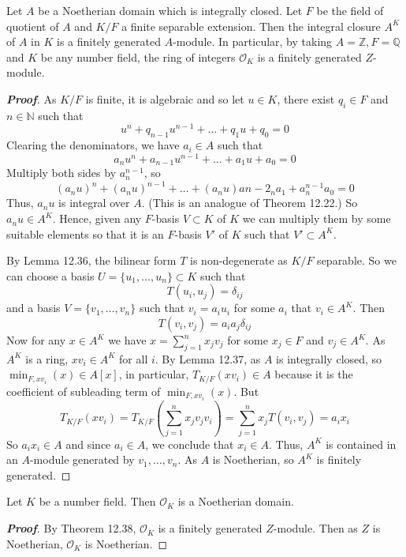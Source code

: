 \begin{theorem} Let $A$ be a Noetherian domain which is integrally closed. Let $F$ be the field of quotient of $A$ and $K/F$ a finite separable extension. Then the integral closure $A^K$ of $A$ in $K$ is a finitely generated $A$-module. In particular, by taking $A=\mathbb{Z},F=\mathbb{Q}$ and $K$ be any number field, the ring of integers $\mathcal{O}_K$ is a finitely generated $Z$-module.
\end{theorem}
\begin{proof}[\bf Proof] As $K/F$ is finite, it is algebraic and so let $u \in K$, there exist $q_i \in F$ and $n \in \mathbb{N}$ such that
$$u^n+q_{n-1}u^{n-1}+\ldots+q_1u+q_0=0$$
Clearing the denominators, we have $a_i \in A$ such that
$$a_nu^n+a_{n-1}u^{n-1}+\ldots+a_1u+a_0=0$$
Multiply both sides by $a^{n-1}_n$, so
$$(a_n u)^n+(a_n u)^{n-1} +\ldots+(a_n u)a{n-2}_na_1+a^{n-1}_n a_0=0$$
Thus, $a_n u$ is integral over $A$. (This is an analogue of Theorem 12.22.) So $a_n u \in A^K$.
Hence, given any $F$-basis $V \subset K$ of $K$ we can multiply them by some suitable elements so that it is an $F$-basis $V'$ of $K$ such that $V' \subset A^K$.

By Lemma 12.36, the bilinear form $T$ is non-degenerate as $K/F$ separable.
So we can choose a basis $U=\{u_1,\ldots,u_n\} \subset K$ such that
$$T(u_i,u_j)=\delta_{ij}$$
and a basis $V=\{v_1,\ldots,v_n\}$ such that $v_i=a_i u_i$ for some $a_i$ that $v_i \in A^K$. Then
$$T(v_i,v_j)=a_i a_j \delta_{ij}$$
Now for any $x \in A^K$ we have $x=\sum_{j=1}^n x_j v_j$ for some $x_j \in F$ and $v_j \in A^K$.
As $A^K$ is a ring, $xv_i \in A^K$ for all $i$. By Lemma 12.37, as $A$ is integrally closed, so
$\min_{F,xv_i}(x) \in A[x]$, in particular, $T_{K/F}(xv_i) \in A$ because it is the coefficient of subleading term
of $\min_{F,xv_i}(x)$. But
$$T_{K/F}(xv_i)=T_{K/F}(\sum_{j=1}^n x_jv_jv_i)=\sum_{j=1}^n x_j T(v_i,v_j)=a_i x_i$$
So $a_i x_i \in A$ and since $a_i \in A$, we conclude that $x_i \in A$. Thus, $A^K$ is contained in an
$A$-module generated by $v_1,\ldots,v_n$. As $A$ is Noetherian, so $A^K$ is finitely generated.
\end{proof}
\begin{corollary} Let $K$ be a number field. Then $\mathcal{O}_K$ is a Noetherian domain.
\end{corollary}
\begin{proof}[\bf Proof] By Theorem 12.38, $\mathcal{O}_K$ is a finitely generated $Z$-module. Then as $Z$ is Noetherian,
$\mathcal{O}_K$ is Noetherian.
\end{proof}
